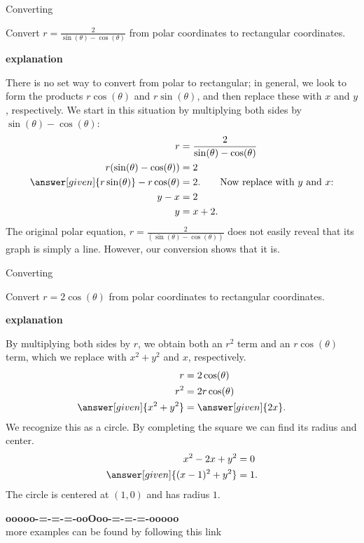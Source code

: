 \documentclass{ximera}
\begin{document}
\begin{example} Converting


   Convert $r=\frac{2}{\sin(\theta)-\cos(\theta)}$ from polar coordinates
   to rectangular coordinates.

\textbf{\textcolor{red!75!green}{explanation}} 

     There is no set way to convert from polar to rectangular; in
     general, we look to form the products $r\cos(\theta)$ and
     $r\sin(\theta)$, and then replace these with $x$ and $y$,
     respectively. We start in this situation by multiplying both sides
     by $\sin(\theta)-\cos(\theta)$:
     \begin{align*}
       r &= \frac{2}{\sin(\theta)-\cos(\theta)} \\
       r(\sin(\theta)-\cos(\theta)) &= 2\\
       \answer[given]{r\sin(\theta)}-r\cos(\theta) &= 2. \qquad \text{Now replace with $y$ and $x$:}\\
       y-x &= 2\\
	  y &= x+2.
     \end{align*}
     The original polar equation, $r=\frac{2}{(\sin(\theta)-\cos(\theta))}$ does
     not easily reveal that its graph is simply a line. However, our
     conversion shows that it is.

\end{example}

\begin{example} Converting 

   Convert $r =2\cos(\theta)$ from polar coordinates to rectangular
   coordinates.        	

\textbf{\textcolor{red!75!green}{explanation}} 

     By multiplying both sides by $r$, we obtain both an $r^2$ term
     and an $r\cos(\theta)$ term, which we replace with $x^2+y^2$ and
     $x$, respectively.
     \begin{align*}
       r &=2\cos(\theta) \\
       r^2 &= 2r\cos(\theta) \\
       \answer[given]{x^2+y^2} &= \answer[given]{2x}. 
     \end{align*}
     We recognize this as a circle. By completing the square we can
     find its radius and center.
     \begin{align*}
       x^2-2x+y^2 &= 0 \\
       \answer[given]{(x-1)^2 + y^2} &=1.
     \end{align*}
     The circle is centered at $(1,0)$ and has radius $1$.

 \end{example}
















\begin{center}
\textbf{\textcolor{green!50!black}{ooooo-=-=-=-ooOoo-=-=-=-ooooo}} \\

more examples can be found by following this link\\ 

\end{center}
\end{document}
